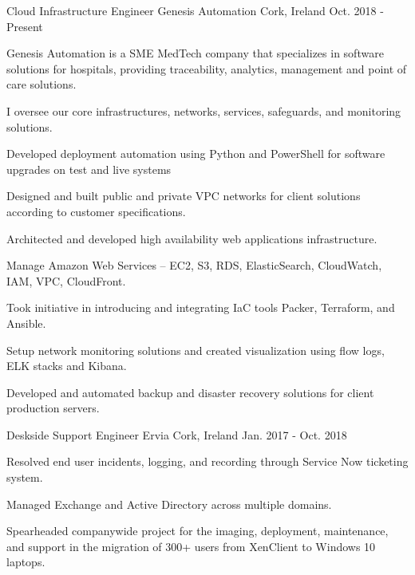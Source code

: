 


\begin{cventries}

\cventry
{Cloud Infrastructure Engineer}
{Genesis Automation}
{Cork, Ireland}
{Oct. 2018 - Present}
{
\begin{cvitems}
\item {Genesis Automation is a SME MedTech company that specializes in software solutions for hospitals, providing traceability, analytics, management and point of care solutions.}
\item {I oversee our core infrastructures, networks, services, safeguards, and monitoring solutions.}
\item {Developed deployment automation using Python and PowerShell for software upgrades on test and live systems}
\item {Designed and built public and private VPC networks for client solutions according to customer specifications.}
\item {Architected and developed high availability web applications infrastructure.}
\item {Manage Amazon Web Services – EC2, S3, RDS, ElasticSearch, CloudWatch, IAM, VPC, CloudFront.}
\item {Took initiative in introducing and integrating IaC tools Packer, Terraform, and Ansible.}
\item {Setup network monitoring solutions and created visualization using flow logs, ELK stacks and Kibana.}
\item {Developed and automated backup and disaster recovery solutions for client production servers.}
\end{cvitems}
}


\cventry
{Deskside Support Engineer} %
{Ervia} %
{Cork, Ireland} %
{Jan. 2017 - Oct. 2018} %
{ %
\begin{cvitems}
\item {Resolved end user incidents, logging, and recording through Service Now ticketing system.}
\item {Managed Exchange and Active Directory across multiple domains.}
\item {Spearheaded companywide project for the imaging, deployment, maintenance, and support in the migration of 300+ users from XenClient to Windows 10 laptops.}
\end{cvitems}
}


\end{cventries}
